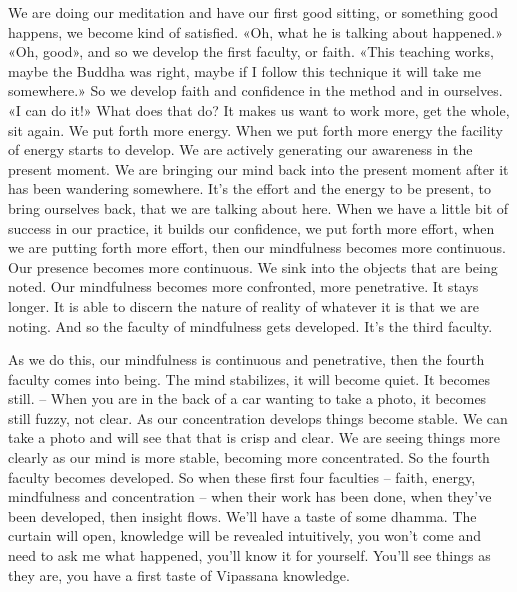 \documentclass[letterpaper,10pt,english]{sphinxmanual}
\begin{document}
\sphinxAtStartPar
We are doing our meditation and have our first good sitting, or something good happens, we become kind of satisfied. «Oh, what he is talking
about  happened.»  «Oh,  good»,  and  so  we  develop  the  first  faculty,
or  faith.  «This  teaching  works,  maybe  the  Buddha  was  right,  maybe  if  I
follow  this  technique  it  will  take  me  somewhere.»  So  we  develop  faith
and  confidence  in  the  method  and  in  ourselves.  «I  can  do  it!»  What  does
that  do?  It  makes  us  want  to  work  more,  get  the  whole,  sit  again. We  put
forth  more  energy.  When  we  put  forth  more  energy  the  facility  of  energy
starts  to  develop. We  are  actively  generating  our  awareness  in  the  present
moment. We are bringing our mind back into the present moment after it has
been wandering somewhere. It’s the effort and the energy to be present, to
bring ourselves back, that we are talking about here. When we have a little
  bit  of  success  in  our  practice,  it  builds  our  confidence,  we  put  forth  more
effort, when we are putting forth more effort, then our mindfulness becomes
more continuous. Our presence becomes more continuous. We sink into the
objects  that  are  being  noted.  Our  mindfulness  becomes  more  confronted,
more penetrative. It stays longer. It is able to discern the nature of reality
of whatever it is that we are noting. And so the faculty of mindfulness gets
developed. It’s the third faculty.

\sphinxAtStartPar
As we do this, our mindfulness is continuous and penetrative, then the
fourth faculty comes into being. The mind stabilizes, it will become quiet. It
becomes still. – When you are in the back of a car wanting to take a photo, it
becomes still fuzzy, not clear. As our concentration develops things become
stable. We can take a photo and will see that that is crisp and clear. We are
seeing things more clearly as our mind is more stable, becoming more concentrated. So the fourth faculty becomes developed. So when these first four
faculties – faith, energy, mindfulness and concentration – when their work
has been done, when they’ve been developed, then insight flows. We’ll have
a taste of some dhamma. The curtain will open, knowledge will be revealed
intuitively, you won’t come and need to ask me what happened, you’ll know
it for yourself. You’ll see things as they are, you have a first taste of Vipassana knowledge.
\end{document}
